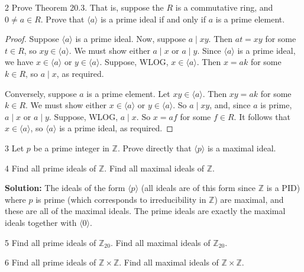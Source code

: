 \begin{problem}{2}
    Prove Theorem 20.3. That is, suppose the $R$ is a commutative ring,
    and $0 \ne a \in R$. Prove that $\langle a \rangle$
    is a prime ideal if and only if $a$ is a prime element.
\end{problem}
\solved

\begin{proof}
    Suppose $\langle a \rangle$ is a prime ideal.
    Now, suppose $a \mid xy$.
    Then $at = xy$ for some $t \in R$, so $xy \in \langle a \rangle$.
    We must show either $a \mid x$ or $a \mid y$.
    Since $\langle a \rangle$ is a prime ideal, we have $x \in \langle a \rangle$ or $y \in \langle a \rangle$.
    Suppose, WLOG, $x \in \langle a \rangle$.
    Then $x = ak$ for some $k \in R$, so $a \mid x$, as required.

    Conversely, suppose $a$ is a prime element.
    Let $xy \in \langle a \rangle$.
    Then $xy = ak$ for some $k \in R$.
    We must show either $x \in \langle a \rangle$ or $y \in \langle a \rangle$.
    So $a \mid xy$, and, since $a$ is prime, $a \mid x$ or $a \mid y$.
    Suppose, WLOG, $a \mid x$.
    So $x = af$ for some $f \in R$.
    It follows that $x \in \langle a \rangle$,
        so $\langle a \rangle$ is a prime ideal, as required.
\end{proof}

\begin{problem}{3}
    Let $p$ be a prime integer in $\mathbb{Z}$. Prove directly that $\langle p \rangle$ is
    a maximal ideal.
\end{problem}
\unsolved

\begin{problem}{4}
    Find all prime ideals of $\mathbb{Z}$. Find all maximal ideals of $\mathbb{Z}$.
\end{problem}
\solved

\textbf{Solution: } The ideals of the form $\langle p \rangle$
(all ideals are of this form since $\mathbb{Z}$ is a PID) where $p$ is prime (which corresponds to irreducibility in $\mathbb{Z}$)
are maximal, and these are all of the maximal ideals.
The prime ideals are exactly the maximal ideals together with $\langle 0 \rangle$.

\begin{problem}{5}
    Find all prime ideals of $\mathbb{Z}_{20}$. Find all maximal ideals of
    $\mathbb{Z}_{20}$.
\end{problem}
\unsolved

\begin{problem}{6}
    Find all prime ideals of $\mathbb{Z} \times \mathbb{Z}$. Find all maximal ideals of
    $\mathbb{Z} \times \mathbb{Z}$.
\end{problem}
\unsolved

